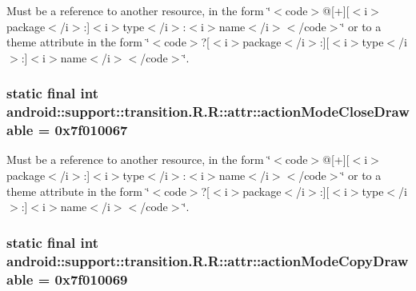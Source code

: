 Must be a reference to another resource, in the form \char`\"{}$<$code$>$@\mbox{[}+\mbox{]}\mbox{[}$<$i$>$package$<$/i$>$:\mbox{]}$<$i$>$type$<$/i$>$:$<$i$>$name$<$/i$>$$<$/code$>$\char`\"{} or to a theme attribute in the form \char`\"{}$<$code$>$?\mbox{[}$<$i$>$package$<$/i$>$:\mbox{]}\mbox{[}$<$i$>$type$<$/i$>$:\mbox{]}$<$i$>$name$<$/i$>$$<$/code$>$\char`\"{}. \hypertarget{classandroid_1_1support_1_1transition_1_1_r_1_1attr_29f31fc41c858ce478b82b51a1b51ed8}{
\subsubsection[{actionModeCloseDrawable}]{\setlength{\rightskip}{0pt plus 5cm}static final int android::support::transition.R.R::attr::actionModeCloseDrawable = 0x7f010067}}
\label{classandroid_1_1support_1_1transition_1_1_r_1_1attr_29f31fc41c858ce478b82b51a1b51ed8}


Must be a reference to another resource, in the form \char`\"{}$<$code$>$@\mbox{[}+\mbox{]}\mbox{[}$<$i$>$package$<$/i$>$:\mbox{]}$<$i$>$type$<$/i$>$:$<$i$>$name$<$/i$>$$<$/code$>$\char`\"{} or to a theme attribute in the form \char`\"{}$<$code$>$?\mbox{[}$<$i$>$package$<$/i$>$:\mbox{]}\mbox{[}$<$i$>$type$<$/i$>$:\mbox{]}$<$i$>$name$<$/i$>$$<$/code$>$\char`\"{}. \hypertarget{classandroid_1_1support_1_1transition_1_1_r_1_1attr_2ad0677ea5fce43443ad1f439e7f1e42}{
\subsubsection[{actionModeCopyDrawable}]{\setlength{\rightskip}{0pt plus 5cm}static final int android::support::transition.R.R::attr::actionModeCopyDrawable = 0x7f010069}}
\label{classandroid_1_1support_1_1transition_1_1_r_1_1attr_2ad0677ea5fce43443ad1f439e7f1e42}


